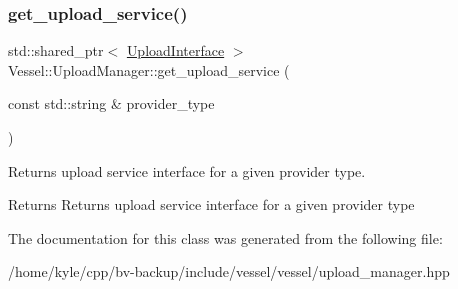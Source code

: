 \subsubsection{\texorpdfstring{get\+\_\+upload\+\_\+service()}{get\_upload\_service()}}
{\footnotesize\ttfamily std\+::shared\+\_\+ptr$<$ \hyperlink{class_vessel_1_1_upload_interface}{Upload\+Interface} $>$ Vessel\+::\+Upload\+Manager\+::get\+\_\+upload\+\_\+service (\begin{DoxyParamCaption}\item[{const std\+::string \&}]{provider\+\_\+type }\end{DoxyParamCaption})\hspace{0.3cm}{\ttfamily [protected]}}



Returns upload service interface for a given provider type. 

\begin{DoxyReturn}{Returns}
Returns upload service interface for a given provider type 
\end{DoxyReturn}


The documentation for this class was generated from the following file\+:\begin{DoxyCompactItemize}
\item 
/home/kyle/cpp/bv-\/backup/include/vessel/vessel/upload\+\_\+manager.\+hpp\end{DoxyCompactItemize}
